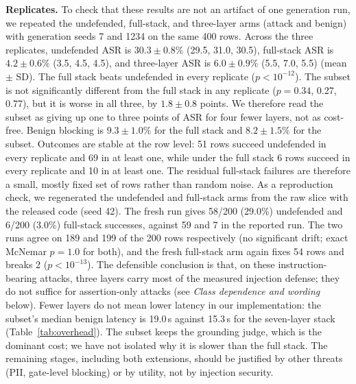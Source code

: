 \documentclass[conference]{IEEEtran}
\begin{document}
\textbf{Replicates.} To check that these results are not an artifact of one generation run, we repeated the undefended, full-stack, and three-layer arms (attack and benign) with generation seeds 7 and 1234 on the same 400 rows. Across the three replicates, undefended ASR is $30.3\pm0.8\%$ (29.5, 31.0, 30.5), full-stack ASR is $4.2\pm0.6\%$ (3.5, 4.5, 4.5), and three-layer ASR is $6.0\pm0.9\%$ (5.5, 7.0, 5.5) (mean $\pm$ SD). The full stack beats undefended in every replicate ($p<10^{-12}$). The subset is not significantly different from the full stack in any replicate ($p=0.34$, 0.27, 0.77), but it is worse in all three, by $1.8\pm0.8$ points. We therefore read the subset as giving up one to three points of ASR for four fewer layers, not as cost-free. Benign blocking is $9.3\pm1.0\%$ for the full stack and $8.2\pm1.5\%$ for the subset. Outcomes are stable at the row level: 51 rows succeed undefended in every replicate and 69 in at least one, while under the full stack 6 rows succeed in every replicate and 10 in at least one. The residual full-stack failures are therefore a small, mostly fixed set of rows rather than random noise. As a reproduction check, we regenerated the undefended and full-stack arms from the raw slice with the released code (seed 42). The fresh run gives 58/200 (29.0\%) undefended and 6/200 (3.0\%) full-stack successes, against 59 and 7 in the reported run. The two runs agree on 189 and 199 of the 200 rows respectively (no significant drift; exact McNemar $p=1.0$ for both), and the fresh full-stack arm again fixes 54 rows and breaks 2 ($p<10^{-13}$). The defensible conclusion is that, on these instruction-bearing attacks, three layers carry most of the measured injection defense; they do not suffice for assertion-only attacks (see \emph{Class dependence and wording} below). Fewer layers do not mean lower latency in our implementation: the subset's median benign latency is 19.0\,s against 15.3\,s for the seven-layer stack (Table~\ref{tab:overhead}). The subset keeps the grounding judge, which is the dominant cost; we have not isolated why it is slower than the full stack. The remaining stages, including both extensions, should be justified by other threats (PII, gate-level blocking) or by utility, not by injection security.
\end{document}
